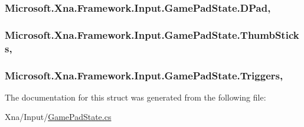 \subsubsection[{D\+Pad}]{ Microsoft.\+Xna.\+Framework.\+Input.\+Game\+Pad\+State.\+D\+Pad\hspace{0.3cm}{\ttfamily [get]}, {\ttfamily [set]}}\label{struct_microsoft_1_1_xna_1_1_framework_1_1_input_1_1_game_pad_state_a9dbfa749985c74757aeab813b9630310}
\hypertarget{struct_microsoft_1_1_xna_1_1_framework_1_1_input_1_1_game_pad_state_a8b899b66a912a00091f3fec597be44e0}{}
\subsubsection[{Thumb\+Sticks}]{ Microsoft.\+Xna.\+Framework.\+Input.\+Game\+Pad\+State.\+Thumb\+Sticks\hspace{0.3cm}{\ttfamily [get]}, {\ttfamily [set]}}\label{struct_microsoft_1_1_xna_1_1_framework_1_1_input_1_1_game_pad_state_a8b899b66a912a00091f3fec597be44e0}
\hypertarget{struct_microsoft_1_1_xna_1_1_framework_1_1_input_1_1_game_pad_state_a0ebd50abf029ab6f4c04c172191f13e0}{}
\subsubsection[{Triggers}]{ Microsoft.\+Xna.\+Framework.\+Input.\+Game\+Pad\+State.\+Triggers\hspace{0.3cm}{\ttfamily [get]}, {\ttfamily [set]}}\label{struct_microsoft_1_1_xna_1_1_framework_1_1_input_1_1_game_pad_state_a0ebd50abf029ab6f4c04c172191f13e0}


The documentation for this struct was generated from the following file\+:\begin{DoxyCompactItemize}
\item 
Xna/\+Input/\hyperlink{_game_pad_state_8cs}{Game\+Pad\+State.\+cs}\end{DoxyCompactItemize}
